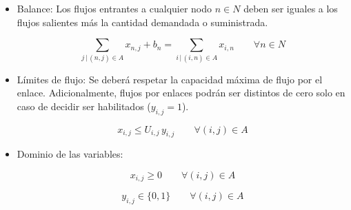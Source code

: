 \begin{itemize}
    \item[a)] Balance: Los flujos entrantes a cualquier nodo $n \in N$ deben ser iguales a los flujos salientes más la cantidad demandada o suministrada.

    \begin{equation}
    \sum_{j\,|\,(n,j)\in A} x_{n,j} + b_n = \sum_{i\,|\,(i,n)\in A} x_{i,n}
    \qquad \forall n \in N
    \end{equation}

    \item[b)] Límites de flujo: Se deberá respetar la capacidad máxima de flujo por el enlace. Adicionalmente, flujos por enlaces podrán ser distintos de cero solo en caso de decidir ser habilitados ($y_{i,j}=1$).
    
    \begin{equation}
    x_{i,j} \leq U_{i,j}\,y_{i,j} \qquad \forall (i,j) \in A
    \end{equation}

    \item[c)] Dominio de las variables:

    \begin{equation}
        x_{i,j} \geq 0 \qquad \forall (i,j) \in A
    \end{equation}

    \begin{equation}
        y_{i,j} \in \{0,1\} \qquad \forall (i,j) \in A
    \end{equation}
    
\end{itemize}
